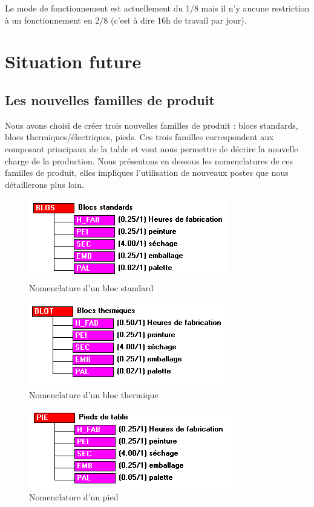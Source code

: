 \documentclass[a4paper]{TPInsa}
\begin{document}
	Le mode de fonctionnement est actuellement du 1/8 mais il n'y aucune restriction à un fonctionnement en 2/8 (c'est à dire 16h de travail par jour).
	\section{Situation future}
	
	\subsection{Les nouvelles familles de produit}
	Nous avons choisi de créer trois nouvelles familles de produit : blocs standards, blocs thermiques/électriques, pieds. Ces trois familles correspondent aux composant principaux de la table et vont nous permettre de décrire la nouvelle charge de la production. 
	Nous présentons en dessous les nomenclatures de ces familles de produit, elles impliques l'utilisation de nouveaux postes que nous détaillerons plus loin. 
	
	\begin{figure}[H]
	\centering
	\includegraphics[scale=0.8]{captures/standard.PNG}
	\caption{Nomenclature d'un bloc standard}
	\end{figure}
	
	\begin{figure}[H]
	\centering
	\includegraphics[scale=0.8]{captures/thermique.PNG}
	\caption{Nomenclature d'un bloc thermique}
	\end{figure}

	\begin{figure}[H]
	\centering
	\includegraphics[scale=0.8]{captures/pied.PNG}
	\caption{Nomenclature d'un pied}
	\end{figure}
	
\end{document}
